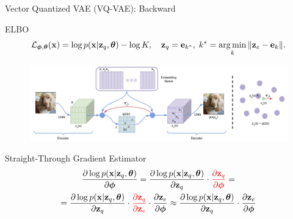 \documentclass{beamer}
\begin{document}
\begin{frame}{Vector Quantized VAE (VQ-VAE): Backward}
	\begin{block}{ELBO}
		\vspace{-0.5cm}
		\[
			\mathcal{L}_{\boldsymbol{\phi}, \boldsymbol{\theta}}(\mathbf{x})  =  \log p(\mathbf{x} | \mathbf{z}_q, \boldsymbol{\theta}) - \log K, \quad \mathbf{z}_q = \mathbf{e}_{k^*},\; k^* = \operatorname*{arg\,min}_k \| \mathbf{z}_e - \mathbf{e}_k \|.
		\]
		\vspace{-0.5cm}
	\end{block}
	\begin{figure}
		\centering
		\includegraphics[width=0.85\linewidth]{figs/vqvae}
	\end{figure}
	\vspace{-0.3cm}
	\begin{block}{Straight-Through Gradient Estimator}
		\vspace{-0.5cm}
		\begin{multline*}
		\frac{\partial \log p(\mathbf{x} | \mathbf{z}_q , \boldsymbol{\theta})}{\partial \boldsymbol{\phi}} = \frac{\partial \log p(\mathbf{x} | \mathbf{z}_q, \boldsymbol{\theta})}{\partial \mathbf{z}_q} \cdot {\color{red}\frac{\partial \mathbf{z}_q}{\partial \boldsymbol{\phi}}} = \\
		= \frac{\partial \log p(\mathbf{x} | \mathbf{z}_q, \boldsymbol{\theta})}{\partial \mathbf{z}_q} \cdot {\color{red}\frac{\partial \mathbf{z}_q}{\partial \mathbf{z}_e}} \cdot \frac{\partial \mathbf{z}_e}{\partial \boldsymbol{\phi}} \approx \frac{\partial \log p(\mathbf{x} | \mathbf{z}_q, \boldsymbol{\theta})}{\partial \mathbf{z}_q} \cdot \frac{\partial \mathbf{z}_e}{\partial \boldsymbol{\phi}}
		\end{multline*}
	\end{block}
\end{frame}
\end{document}
